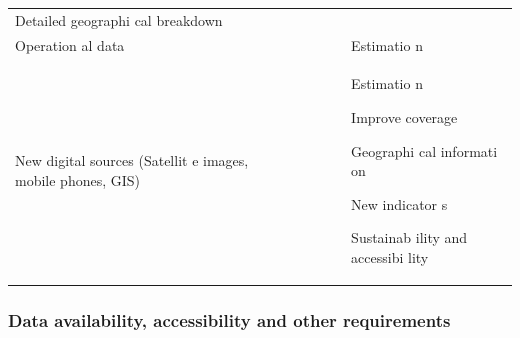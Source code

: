 \documentclass[
]{article}
\begin{document}
\begin{longtable}[]{@{}llllll@{}}
\begin{minipage}[t]{0.14\columnwidth}
Detailed
geographi
cal
breakdown\strut
\end{minipage}\tabularnewline
\begin{minipage}[t]{0.14\columnwidth}\raggedright
Operation
al
data\strut
\end{minipage} & \begin{minipage}[t]{0.14\columnwidth}\raggedright
\strut
\end{minipage} & \begin{minipage}[t]{0.14\columnwidth}\raggedright
\strut
\end{minipage} & \begin{minipage}[t]{0.14\columnwidth}\raggedright
\strut
\end{minipage} & \begin{minipage}[t]{0.14\columnwidth}\raggedright
\strut
\end{minipage} & \begin{minipage}[t]{0.14\columnwidth}\raggedright
Estimatio
n\strut
\end{minipage}\tabularnewline
\begin{minipage}[t]{0.14\columnwidth}\raggedright
New
digital
sources
(Satellit
e
images,
mobile
phones,
GIS)\strut
\end{minipage} & \begin{minipage}[t]{0.14\columnwidth}\raggedright
\strut
\end{minipage} & \begin{minipage}[t]{0.14\columnwidth}\raggedright
\strut
\end{minipage} & \begin{minipage}[t]{0.14\columnwidth}\raggedright
\strut
\end{minipage} & \begin{minipage}[t]{0.14\columnwidth}\raggedright
\strut
\end{minipage} & \begin{minipage}[t]{0.14\columnwidth}\raggedright
Estimatio
n

Improve
coverage

Geographi
cal
informati
on

New
indicator
s

Sustainab
ility
and
accessibi
lity\strut
\end{minipage}\tabularnewline
\bottomrule
\end{longtable}

\hypertarget{d.2.-data-availability-accessibility-and-other-requirements}{%
\subsubsection{Data availability, accessibility and other requirements}\label{d.2.-data-availability-accessibility-and-other-requirements}}
\end{document}
